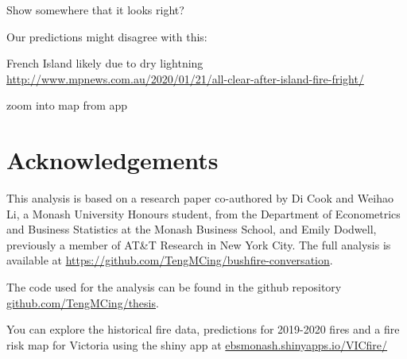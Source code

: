 \documentclass[
  11pt,
  a4paper,
]{article}
\begin{document}
Show somewhere that it looks right?

Our predictions might disagree with this:

French Island likely due to dry lightning
\url{http://www.mpnews.com.au/2020/01/21/all-clear-after-island-fire-fright/}

zoom into map from app

\hypertarget{acknowledgements}{%
\section{Acknowledgements}\label{acknowledgements}}

This analysis is based on a research paper co-authored by Di Cook and Weihao Li, a Monash University Honours student, from the Department of Econometrics and Business Statistics at the Monash Business School, and Emily Dodwell, previously a member of AT\&T Research in New York City. The full analysis is available at \url{https://github.com/TengMCing/bushfire-conversation}.

The code used for the analysis can be found in the github repository \href{https://github.com/TengMCing/thesis}{github.com/TengMCing/thesis}.

You can explore the historical fire data, predictions for 2019-2020 fires and a fire risk map for Victoria using the shiny app at \href{https://ebsmonash.shinyapps.io/VICfire/}{ebsmonash.shinyapps.io/VICfire/}

\printbibliography
\end{document}
